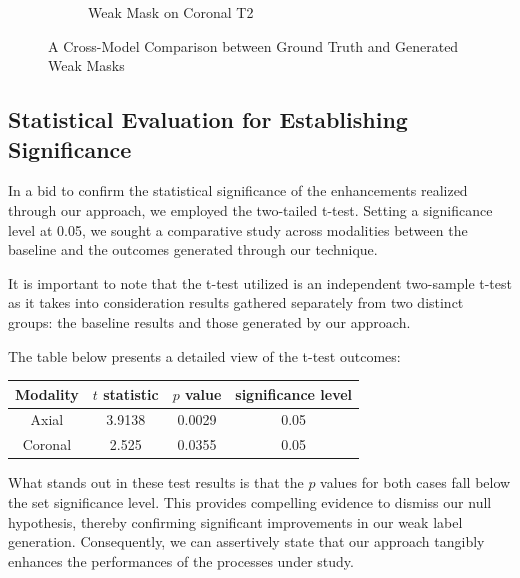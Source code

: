 \begin{figure}[htp]
\begin{subfigure}[b]{0.48\textwidth}
        \caption{Weak Mask on Coronal T2}
        \label{fig:mask-coronal}
    \end{subfigure}
       \caption{A Cross-Model Comparison between Ground Truth and Generated Weak Masks}
       \label{fig:comparison-mask-gt}
\end{figure}
\subsection{Statistical Evaluation for Establishing Significance}

In a bid to confirm the statistical significance of the enhancements realized through our approach, we employed the two-tailed t-test. Setting a significance level at 0.05, we sought a comparative study across modalities between the baseline and the outcomes generated through our technique.

It is important to note that the t-test utilized is an independent two-sample t-test as it takes into consideration results gathered separately from two distinct groups: the baseline results and those generated by our approach.

The table below presents a detailed view of the t-test outcomes:

\begin{table}[ht]
\centering
\begin{tabular}{c|c|c|c}
Modality & \(t\) statistic & \(p\) value & significance level \\
\hline
Axial & 3.9138 & 0.0029 & 0.05 \\
\hline
Coronal & 2.525 & 0.0355 & 0.05
\end{tabular}
\end{table}

What stands out in these test results is that the \(p\) values for both cases fall below the set significance level. This provides compelling evidence to dismiss our null hypothesis, thereby confirming significant improvements in our weak label generation. Consequently, we can assertively state that our approach tangibly enhances the performances of the processes under study.

